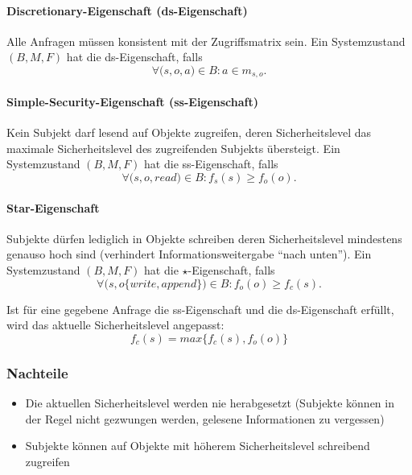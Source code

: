 \paragraph{Discretionary-Eigenschaft (ds-Eigenschaft)}
Alle Anfragen müssen konsistent mit der Zugriffsmatrix sein. Ein Systemzustand \((B,M,F)\) hat die ds-Eigenschaft, falls
\[\forall\big(s,o,a\big) \in B : a \in m_{s,o}.\]

\paragraph{Simple-Security-Eigenschaft (ss-Eigenschaft)}
Kein Subjekt darf lesend auf Objekte zugreifen, deren Sicherheitslevel das maximale Sicherheitslevel des zugreifenden Subjekts übersteigt. Ein Systemzustand \((B,M,F)\) hat die ss-Eigenschaft, falls
\[\forall\big(s,o,read\big) \in B : f_s(s) \geq f_o(o).\]

\paragraph{Star-Eigenschaft}
Subjekte dürfen lediglich in Objekte schreiben deren Sicherheitslevel mindestens genauso hoch sind (verhindert Informationsweitergabe "`nach unten"'). Ein Systemzustand \((B,M,F)\) hat die \(\star\)-Eigenschaft, falls
\[\forall\big(s,o\{write,append\}\big) \in B : f_o(o) \geq f_c(s).\]

Ist für eine gegebene Anfrage die ss-Eigenschaft und die ds-Eigenschaft erfüllt, wird das aktuelle Sicherheitslevel angepasst:
\[f_c(s) = max\big\{f_c(s),f_o(o)\big\}\]

\subsubsection{Nachteile}
\begin{itemize}
	\item Die aktuellen Sicherheitslevel werden nie herabgesetzt (Subjekte können in der Regel nicht gezwungen werden, gelesene Informationen zu vergessen)
	\item Subjekte können auf Objekte mit höherem Sicherheitslevel schreibend zugreifen
\end{itemize}


